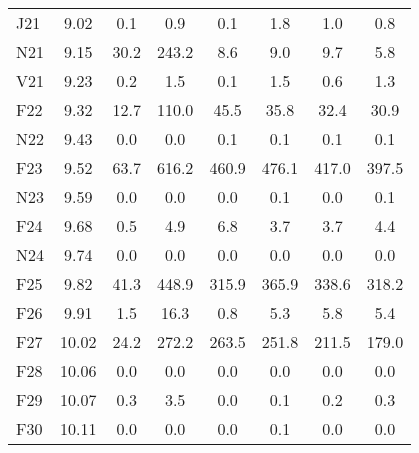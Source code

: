 \documentclass[article,crop=false]{standalone}%
\begin{document}
\begin{tabular}[h]{l c c c c c c c}
\rowcolor{white}%
J21&9.02&0.1&0.9&0.1&1.8&1.0&0.8\\%
\rowcolor{lightgray}%
N21&9.15&30.2&243.2&8.6&9.0&9.7&5.8\\%
\rowcolor{white}%
V21&9.23&0.2&1.5&0.1&1.5&0.6&1.3\\%
\rowcolor{lightgray}%
F22&9.32&12.7&110.0&45.5&35.8&32.4&30.9\\%
\rowcolor{white}%
N22&9.43&0.0&0.0&0.1&0.1&0.1&0.1\\%
\rowcolor{lightgray}%
F23&9.52&63.7&616.2&460.9&476.1&417.0&397.5\\%
\rowcolor{white}%
N23&9.59&0.0&0.0&0.0&0.1&0.0&0.1\\%
\rowcolor{lightgray}%
F24&9.68&0.5&4.9&6.8&3.7&3.7&4.4\\%
\rowcolor{white}%
N24&9.74&0.0&0.0&0.0&0.0&0.0&0.0\\%
\rowcolor{lightgray}%
F25&9.82&41.3&448.9&315.9&365.9&338.6&318.2\\%
\rowcolor{white}%
F26&9.91&1.5&16.3&0.8&5.3&5.8&5.4\\%
\rowcolor{lightgray}%
F27&10.02&24.2&272.2&263.5&251.8&211.5&179.0\\%
\rowcolor{white}%
F28&10.06&0.0&0.0&0.0&0.0&0.0&0.0\\%
\rowcolor{lightgray}%
F29&10.07&0.3&3.5&0.0&0.1&0.2&0.3\\%
\rowcolor{white}%
F30&10.11&0.0&0.0&0.0&0.1&0.0&0.0\\%
\hline%
\end{tabular}%
\end{document}

